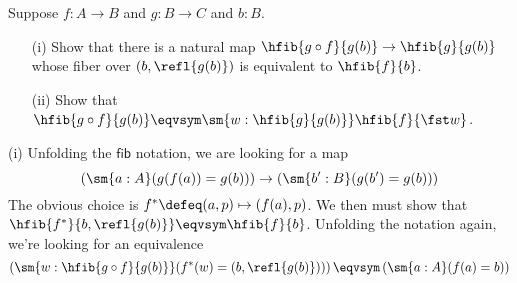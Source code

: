 Suppose $f : A \to B$ and $g : B \to C$ and $b : B$.
\begin{itemize}
  \item[(i)] Show that there is a natural map $\hfib{g \circ f}{g(b)} \to
      \hfib{g}{g(b)}$ whose fiber over $(b, \refl{g(b)})$ is equivalent to
      $\hfib{f}{b}$.
  \item[(ii)] Show that $\hfib{g \circ f}{g(b)} \eqvsym \sm{w:\hfib{g}{g(b)}}
      \hfib{f}{\fst w}$.
\end{itemize}


 \soln
(i) Unfolding the $\mathsf{fib}$ notation, we are looking for a map
\[
  \left(\sm{a:A} (g(f(a)) = g(b))\right) \to
  \left(\sm{b':B} (g(b') = g(b))\right)
\]
The obvious choice is $f^{*} \defeq (a, p) \mapsto (f(a), p)$.  We then must
show that $\hfib{f^{*}}{b, \refl{g(b)}} \eqvsym \hfib{f}{b}$.  Unfolding the
notation again, we're looking for an equivalence
\[
  \left(\sm{w:\hfib{g \circ f}{g(b)}} (f^{*}(w) = (b, \refl{g(b)}))\right)
  \eqvsym
  \left(\sm{a:A} (f(a) = b)\right)
\]


